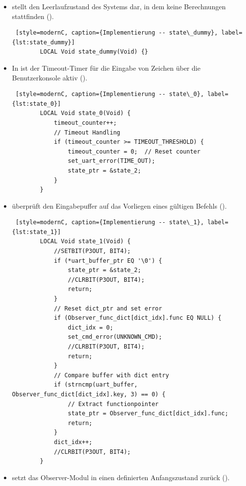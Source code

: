 \begin{itemize}
    \item \textbf{} stellt den Leerlaufzustand des Systems dar, in dem keine Berechnungen stattfinden ().
	
	\vspace{0.5cm}
	\begin{lstlisting} [style=modernC, caption={Implementierung -- state\_dummy}, label={lst:state_dummy}]
		LOCAL Void state_dummy(Void) {}
	\end{lstlisting}
	
	\newpage
    \item In \textbf{} ist der Timeout-Timer f\"ur die Eingabe von Zeichen \"uber die Benutzerkonsole aktiv ().

	\vspace{0.5cm}
	\begin{lstlisting} [style=modernC, caption={Implementierung -- state\_0}, label={lst:state_0}]
		LOCAL Void state_0(Void) {
			timeout_counter++;
			// Timeout Handling
			if (timeout_counter >= TIMEOUT_THRESHOLD) {
				timeout_counter = 0;  // Reset counter
				set_uart_error(TIME_OUT);
				state_ptr = &state_2;
			}
		}
	\end{lstlisting}
	
    \item \textbf{} \"uberpr\"uft den Eingabepuffer auf das Vorliegen eines g\"ultigen Befehls ().
	
	\vspace{0.5cm}
	\begin{lstlisting} [style=modernC, caption={Implementierung -- state\_1}, label={lst:state_1}]
		LOCAL Void state_1(Void) {
			//SETBIT(P3OUT, BIT4);
			if (*uart_buffer_ptr EQ '\0') {
				state_ptr = &state_2;
				//CLRBIT(P3OUT, BIT4);
				return;
			}
			// Reset dict_ptr and set error
			if (Observer_func_dict[dict_idx].func EQ NULL) {
				dict_idx = 0;
				set_cmd_error(UNKNOWN_CMD);
				//CLRBIT(P3OUT, BIT4);
				return;
			}
			// Compare buffer with dict entry
			if (strncmp(uart_buffer, Observer_func_dict[dict_idx].key, 3) == 0) {
				// Extract functionpointer
				state_ptr = Observer_func_dict[dict_idx].func;
				return;
			}
			dict_idx++;
			//CLRBIT(P3OUT, BIT4);
		}
	\end{lstlisting}
	
	\newpage
    \item \textbf{} setzt das Observer-Modul in einen definierten Anfangszustand zur\"uck ().
	

\end{itemize}
